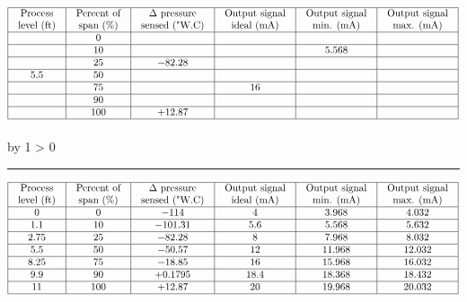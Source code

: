 \documentclass[12pt,a4paper]{article}
\def\notes{
           \advance\explnum by 1
           \ifnum \explnum > 0
                \hrule
                \vskip 3pt
                \leftline{Notes \the\explnum}
                \vskip 3pt \fi}
\begin{document}
$$\vbox{\offinterlineskip
\halign{\strut
\vrule \quad\hfil # \ \hfil & 
\vrule \quad\hfil # \ \hfil & 
\vrule \quad\hfil # \ \hfil & 
\vrule \quad\hfil # \ \hfil & 
\vrule \quad\hfil # \ \hfil & 
\vrule \quad\hfil # \ \hfil \vrule \cr
\noalign{\hrule}
%
Process & Percent of & $\Delta$ pressure & Output signal & Output signal & Output signal \cr
%
level (ft) & span (\%) & sensed ("W.C) & ideal (mA) & min. (mA) & max. (mA) \cr
%
\noalign{\hrule}
%
  & 0 &  &  &  &  \cr
%
\noalign{\hrule}
%
  & 10 &  &  & 5.568 &  \cr
%
\noalign{\hrule}
%
  & 25 & $-82.28$ &  &  &  \cr
%
\noalign{\hrule}
%
5.5  & 50 &  &  &  &  \cr
%
\noalign{\hrule}
%
  & 75 &  & 16 &  &  \cr
%
\noalign{\hrule}
%
  & 90 &  &  &  &  \cr
%
\noalign{\hrule}
%
  & 100 & +12.87 &  &  &  \cr
%
\noalign{\hrule}
} %
}$$ %

\vskip 10pt \filbreak 





\notes{} 


$$\vbox{\offinterlineskip
\halign{\strut
\vrule \quad\hfil # \ \hfil & 
\vrule \quad\hfil # \ \hfil & 
\vrule \quad\hfil # \ \hfil & 
\vrule \quad\hfil # \ \hfil & 
\vrule \quad\hfil # \ \hfil & 
\vrule \quad\hfil # \ \hfil \vrule \cr
\noalign{\hrule}
%
Process & Percent of & $\Delta$ pressure & Output signal & Output signal & Output signal \cr
%
level (ft) & span (\%) & sensed ("W.C) & ideal (mA) & min. (mA) & max. (mA) \cr
%
\noalign{\hrule}
%
0 & 0 & $-114$ & 4 & 3.968 & 4.032 \cr
%
\noalign{\hrule}
%
1.1 & 10 & $-101.31$ & 5.6 & 5.568 & 5.632 \cr
%
\noalign{\hrule}
%
2.75 & 25 & $-82.28$ & 8 & 7.968 & 8.032 \cr
%
\noalign{\hrule}
%
5.5 & 50 & $-50.57$ & 12 & 11.968 & 12.032 \cr
%
\noalign{\hrule}
%
8.25 & 75 & $-18.85$ & 16 & 15.968 & 16.032 \cr
%
\noalign{\hrule}
%
9.9 & 90 & +0.1795 & 18.4 & 18.368 & 18.432 \cr
%
\noalign{\hrule}
%
11 & 100 & +12.87 & 20 & 19.968 & 20.032 \cr
%
\noalign{\hrule}
} %
}$$ %

\end{document}
